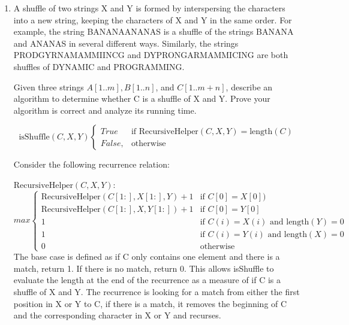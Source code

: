 \documentclass{article}
\newcommand{\question}[1]{\bgroup\color{blue}#1\egroup}
\begin{document}
\begin{enumerate}
\item 
  \question{
A shuffle of two strings X and Y is formed by interspersing the characters into a new string,
keeping the characters of X and Y in the same order. For example, the string BANANAANANAS
is a shuffle of the strings BANANA and ANANAS in several different ways.
Similarly, the strings PRODGYRNAMAMMIINCG and DYPRONGARMAMMICING are both
shuffles of DYNAMIC and PROGRAMMING.
}

Given three strings $A[1..m], B[1..n]$, and $C[1..m + n]$, describe an algorithm to determine
whether C is a shuffle of X and Y. Prove your algorithm is correct and analyze its running time.

$$
\text{isShuffle}(C, X, Y) 
    \begin{cases}
    
      True & \text{if } \text{RecursiveHelper}(C,X,Y) = \text{length}(C) \\
    False, & \text{otherwise}
    \end{cases}
$$


Consider the following recurrence relation:


$\text{RecursiveHelper}(C, X, Y)$:\\
$$
    max  
    \begin{cases}
      \text{RecursiveHelper}(C[1:], X[1:], Y) + 1   & \text{if } C[0] = X[0])\\
      \text{RecursiveHelper}(C[1:], X, Y[1:]) + 1    & \text{if } C[0] = Y[0]\\
      1  & \text{if } C(i) = X(i) \text{ and } \text{length}(Y) = 0\\
      1  & \text{if } C(i) = Y(i) \text{ and } \text{length}(X) = 0\\
        0 & \text{otherwise}
    \end{cases}
$$
The base case is defined as if C only contains one element and there is a match, return 1. If there is no match, return 0. This allows isShuffle to evaluate the length at the end of the recurrence as a measure of if C is a shuffle of X and Y.
The recurrence is looking for a match from either the first position in X or Y to C, if there is a match, it removes the beginning of C and the corresponding character in X or Y and recurses. \\


\end{enumerate}
\end{document}
